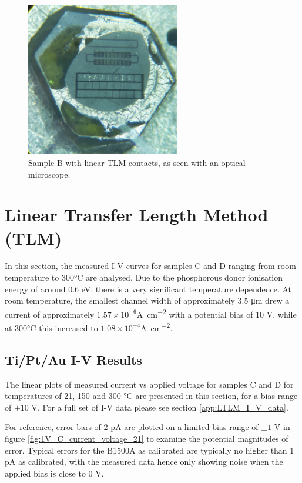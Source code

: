 \begin{figure}[h]
\centering
\includegraphics[width=0.6\textwidth]{Chapter6/Figs/Raster/Sample D 2019/TLMB.jpg}
\caption{Sample B with linear TLM contacts, as seen with an optical microscope.}
\label{fig:TLMB}
\end{figure}

\section{Linear Transfer Length Method (TLM)}
In this section, the measured I-V curves for samples C and D ranging from room temperature to 300\si{\degreeCelsius} are analysed. Due to the phosphorous donor ionisation energy of around 0.6 \si{\electronvolt}, there is a very significant temperature dependence. At room temperature, the smallest channel width of approximately 3.5 \si{\micro\metre} drew a current of approximately $1.57\times10^{-6}$\si{\ampere\per\centi\metre\squared} with a potential bias of 10 \si{\volt}, while at 300\si{\degreeCelsius} this increased to $1.08\times10^{-4}$\si{\ampere\per\centi\metre\squared}. 

\subsection{Ti/Pt/Au I-V Results}
The linear plots of measured current vs applied voltage for samples C and D for temperatures of 21, 150 and 300 \si{\degreeCelsius} are presented in this section, for a bias range of $\pm10$ \si{\volt}. For a full set of I-V data please see section \ref{app:LTLM_I_V_data}.

For reference, error bars of 2 \si{\pico\ampere} are plotted on a limited bias range of $\pm1$ \si{\volt} in figure \ref{fig:1V_C_current_voltage_21} to examine the potential magnitudes of error. Typical errors for the B1500A as calibrated are typically no higher than 1 \si{\pico\ampere} as calibrated, with the measured data hence only showing noise when the applied bias is close to 0 \si{\volt}.

